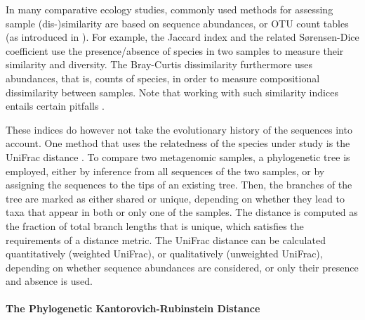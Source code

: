 In many comparative ecology studies, commonly used methods for assessing sample (dis-)similarity are based on
sequence abundances, or OTU count tables
(as introduced in ).
For example, the Jaccard index \cite{Jaccard1901} and the related S\o{}rensen-Dice coefficient \cite{Sorensen1948,Dice1945}
use the presence/absence of species in two samples to measure their similarity and diversity.
The Bray-Curtis dissimilarity \cite{Bray1957,Legendre1998} furthermore uses abundances,
that is, counts of species, in order to measure compositional dissimilarity between samples.
Note that working with such similarity indices entails certain pitfalls \cite{Bloom1981}.

These indices do however not take the evolutionary history of the sequences into account.
One method that uses the relatedness of the species under study is the UniFrac distance \cite{Lozupone2005,Lozupone2007a}.
To compare two metagenomic samples, a phylogenetic tree is employed,
either by inference from all sequences of the two samples,
or by assigning the sequences to the tips of an existing tree.
Then, the branches of the tree are marked as either shared or unique,
depending on whether they lead to taxa that appear in both or only one of the samples.
The distance is computed as the fraction of total branch lengths that is unique,
which satisfies the requirements of a distance metric.
The UniFrac distance can be calculated quantitatively (weighted UniFrac), or qualitatively (unweighted UniFrac),
depending on whether sequence abundances are considered, or only their presence and absence is used.

\paragraph{The Phylogenetic Kantorovich-Rubinstein Distance}
\label{ch:Foundations:sec:PhylogeneticPlacement:sub:Distances:par:KR}


